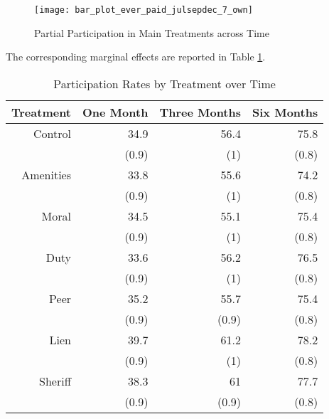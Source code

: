 \documentclass[12pt,titlepage]{article}
\begin{document}
\begin{figure}[htpb]
\begin{center}
\caption{Partial Participation in Main Treatments across Time}
\label{fig:ep_time_7_own}
\bigskip
\texttt{[image: bar\_plot\_ever\_paid\_julsepdec\_7\_own]}
\end{center}
\end{figure}


The corresponding marginal effects are reported in Table \ref{tbl:marg}.

\begin{table}[ht]
\centering
\caption{Participation Rates by Treatment over Time} 
\label{tbl:marg}
\begin{tabular}{rrrr}
  \hline
Treatment & One Month & Three Months & Six Months \\ 
  \hline
Control & 34.9 & 56.4 & 75.8 \\ 
   & (0.9) & (1) & (0.8) \\ 
  Amenities & 33.8 & 55.6 & 74.2 \\ 
   & (0.9) & (1) & (0.8) \\ 
  Moral & 34.5 & 55.1 & 75.4 \\ 
   & (0.9) & (1) & (0.8) \\ 
  Duty & 33.6 & 56.2 & 76.5 \\ 
   & (0.9) & (1) & (0.8) \\ 
  Peer & 35.2 & 55.7 & 75.4 \\ 
   & (0.9) & (0.9) & (0.8) \\ 
  Lien & 39.7 & 61.2 & 78.2 \\ 
   & (0.9) & (1) & (0.8) \\ 
  Sheriff & 38.3 & 61 & 77.7 \\ 
   & (0.9) & (0.9) & (0.8) \\ 
   \hline
\end{tabular}
\end{table}
\end{document}
